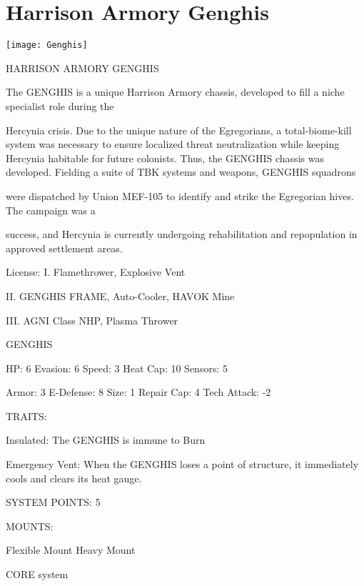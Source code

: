 \section{Harrison Armory Genghis}

\texttt{[image: Genghis]}

                                  HARRISON ARMORY GENGHIS

The GENGHIS is a unique Harrison Armory chassis, developed to fill a niche specialist role during the

Hercynia crisis. Due to the unique nature of the Egregorians, a total-biome-kill system was necessary to
ensure localized threat neutralization while keeping Hercynia habitable for future colonists. Thus, the
GENGHIS chassis was developed. Fielding a suite of TBK systems and weapons, GENGHIS squadrons

were dispatched by Union MEF-105 to identify and strike the Egregorian hives. The campaign was a

success, and Hercynia is currently undergoing rehabilitation and repopulation in approved settlement areas.

                                                       License:
I. Flamethrower, Explosive Vent

II. GENGHIS FRAME, Auto-Cooler, HAVOK Mine

III. AGNI Class NHP, Plasma Thrower





                                                GENGHIS

HP: 6          Evasion: 6                            Speed: 3            Heat Cap: 10       Sensors: 5

Armor: 3       E-Defense: 8                          Size: 1             Repair Cap: 4      Tech Attack: -2

                                                  TRAITS:

Insulated: The GENGHIS is immune to Burn

Emergency Vent: When the GENGHIS loses a point of structure, it immediately cools and clears its
heat gauge.

                                            SYSTEM POINTS: 5

                                                 MOUNTS:

Flexible Mount                                        Heavy Mount

                                               CORE system

